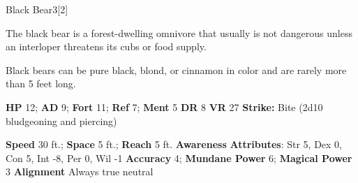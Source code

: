   \begin{monsection}{Black Bear}{3}[2]
    \vspace{-1em}\vspace{-1em}
    \vspace{0em}

    
      The black bear is a forest-dwelling omnivore that usually is not dangerous unless an interloper threatens its cubs or food supply.

      Black bears can be pure black, blond, or cinnamon in color and are rarely more than 5 feet long.
    
    

    \begin{spellcontent}
      \begin{spelltargetinginfo}
        \pari \textbf{HP} 12;
          \textbf{AD} 9;
          \textbf{Fort} 11;
          \textbf{Ref} 7;
          \textbf{Ment} 5
        \pari \textbf{DR} 8
        \pari \textbf{VR} 27
        \pari \textbf{Strike:}
            Bite  (2d10 bludgeoning and piercing)
      \end{spelltargetinginfo}
    \end{spellcontent}
    \begin{monsterfooter}
      \pari \textbf{Speed} 30 ft.;
        \textbf{Space} 5 ft.;
        \textbf{Reach} 5 ft.
      \pari \textbf{Awareness} 
      \pari \textbf{Attributes}:
        Str 5, Dex 0,
        Con 5, Int -8,
        Per 0, Wil -1
      \pari \textbf{Accuracy} 4;
        \textbf{Mundane Power} 6;
      \textbf{Magical Power} 3
      \pari \textbf{Alignment} Always true neutral
    \end{monsterfooter}
  \end{monsection}
  
